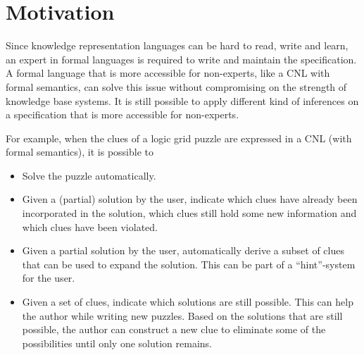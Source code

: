 \section{Motivation}
Since knowledge representation languages can be hard to read, write and learn, an expert in formal languages is required to write and maintain the specification. A formal language that is more accessible for non-experts, like a CNL with formal semantics, can solve this issue without compromising on the strength of knowledge base systems. It is still possible to apply different kind of inferences on a specification that is more accessible for non-experts.

For example, when the clues of a logic grid puzzle are expressed in a CNL (with formal semantics), it is possible to
\begin{itemize}
  \item Solve the puzzle automatically.
  \item Given a (partial) solution by the user, indicate which clues have already been incorporated in the solution, which clues still hold some new information and which clues have been violated.
  \item Given a partial solution by the user, automatically derive a subset of clues that can be used to expand the solution. This can be part of a ``hint''-system for the user.
  \item Given a set of clues, indicate which solutions are still possible. This can help the author while writing new puzzles. Based on the solutions that are still possible, the author can construct a new clue to eliminate some of the possibilities until only one solution remains.
\end{itemize}
